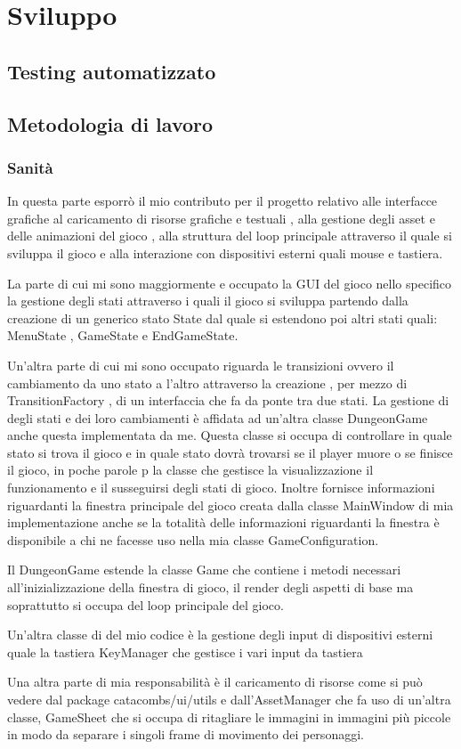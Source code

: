 \documentclass[a4paper,12pt]{report}
\begin{document}
    \chapter{Sviluppo}
    \section{Testing automatizzato}
    \section{Metodologia di lavoro}
    \subsection{Sanità}
    \par In questa parte esporrò il mio contributo per il progetto relativo alle interfacce grafiche al caricamento di risorse grafiche
    e testuali , alla gestione degli asset e delle animazioni del gioco , alla struttura del loop principale attraverso il quale si
    sviluppa il gioco e alla interazione con dispositivi esterni quali mouse e tastiera.
    \par La parte di cui mi sono maggiormente e occupato la GUI del gioco nello specifico la gestione degli stati attraverso i quali
    il gioco si sviluppa partendo dalla creazione di un generico stato State dal quale si estendono poi altri stati quali:
    MenuState , GameState e EndGameState.
    \par Un’altra parte di cui mi sono occupato riguarda le transizioni ovvero il cambiamento da uno stato a l’altro attraverso la creazione
    , per mezzo di  TransitionFactory , di un interfaccia che fa da ponte tra due stati. La gestione di degli stati e dei loro
    cambiamenti è affidata ad un'altra classe DungeonGame anche questa implementata da me. Questa classe si occupa di controllare
    in quale stato si trova il gioco e in quale stato dovrà trovarsi se il player muore o se finisce il gioco, in poche parole p la
    classe che gestisce la visualizzazione il funzionamento e il susseguirsi degli stati di gioco. Inoltre fornisce informazioni
    riguardanti la finestra principale del gioco creata dalla classe MainWindow di mia implementazione anche se la totalità delle
    informazioni riguardanti la finestra è disponibile a chi  ne facesse uso nella mia classe GameConfiguration.
    \par Il DungeonGame estende la classe Game che contiene i metodi necessari all’inizializzazione della finestra di gioco,
    il render degli aspetti di base ma soprattutto si occupa del loop principale del gioco.
    \par Un’altra classe di del mio codice è la gestione degli input di dispositivi esterni quale la tastiera KeyManager che
    gestisce i vari input da tastiera
    \par Una altra parte di mia responsabilità è il caricamento di risorse come si può vedere dal package catacombs/ui/utils
    e dall’AssetManager che fa uso di un’altra classe, GameSheet che si occupa di ritagliare le immagini in immagini più piccole
    in modo da separare i singoli frame di movimento dei personaggi.
\end{document}
